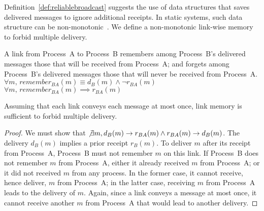 Definition~\ref{def:reliablebroadcast} suggests the use of data structures that
saves delivered messages to ignore additional receipts. In static systems, such
data structure can be non-monotonic~\cite{raynal2013distributed}. We define a
non-monotonic link-wise memory to forbid multiple delivery.

\begin{definition}
  A link from Process~A to Process~B remembers among Process~B's delivered
  messages those that will be received from Process~A; and forgets among
  Process~B's delivered messages those that will never be received from
  Process~A.\\
  $\forall m,\, remember_{BA}(m) \equiv d_B(m) \wedge \neg r_{BA}(m)$ \\
  $\forall m,\, remember_{BA}(m) \implies r_{BA}(m)$
\end{definition}


\begin{theorem}
  Assuming that each link conveys each message at most once, link memory is
  sufficient to forbid multiple delivery.
\end{theorem}

\begin{proof}
  We must show that
  $\not\exists m, d_B(m) \rightarrow r_{BA}(m) \wedge r_{BA}(m) \rightarrow
  d_B(m)$.
  The delivery $d_B(m)$ implies a prior receipt $r_B(m)$.  To deliver $m$ after
  its receipt from Process~A, Process~B must not remember $m$ on this link.  If
  Process~B does not remember $m$ from Process~A, either it already received $m$
  from Process~A; or it did not received $m$ from any process. In the former
  case, it cannot receive, hence deliver, $m$ from Process~A; in the latter
  case, receiving $m$ from Process~A leads to the delivery of $m$. Again, since
  a link conveys a message at most once, it cannot receive another $m$ from
  Process~A that would lead to another delivery.
\end{proof}


